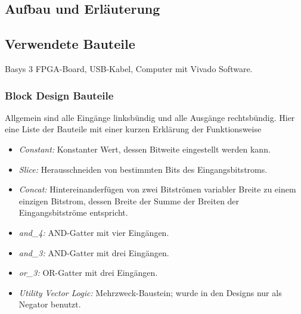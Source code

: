 \documentclass[11pt, a4paper]{article}
\begin{document}
\subsection*{Aufbau und Erläuterung}
\subsection*{Verwendete Bauteile}
Basys 3 FPGA-Board, USB-Kabel, Computer mit Vivado Software.
\subsubsection*{Block Design Bauteile}
Allgemein sind alle Eingänge linksbündig und alle Ausgänge rechtsbündig.
Hier eine Liste der Bauteile mit einer kurzen Erklärung der Funktionsweise
\begin{itemize}	
	\item \textit{Constant:} Konstanter Wert, dessen Bitweite eingestellt werden kann.
	\item \textit{Slice:} Herausschneiden von bestimmten Bits des Eingangsbitstroms.
	\item \textit{Concat:} Hintereinanderfügen von zwei Bitströmen variabler Breite zu einem einzigen Bitstrom, dessen Breite der Summe der Breiten der Eingangsbitströme entspricht.
	\item \textit{and\_4:} AND-Gatter mit vier Eingängen.
	\item \textit{and\_3:} AND-Gatter mit drei Eingängen.
	\item \textit{or\_3:} OR-Gatter mit drei Eingängen.
	\item \textit{Utility Vector Logic:} Mehrzweck-Baustein; wurde in den Designs nur als Negator benutzt.
\end{itemize}
\end{document}
